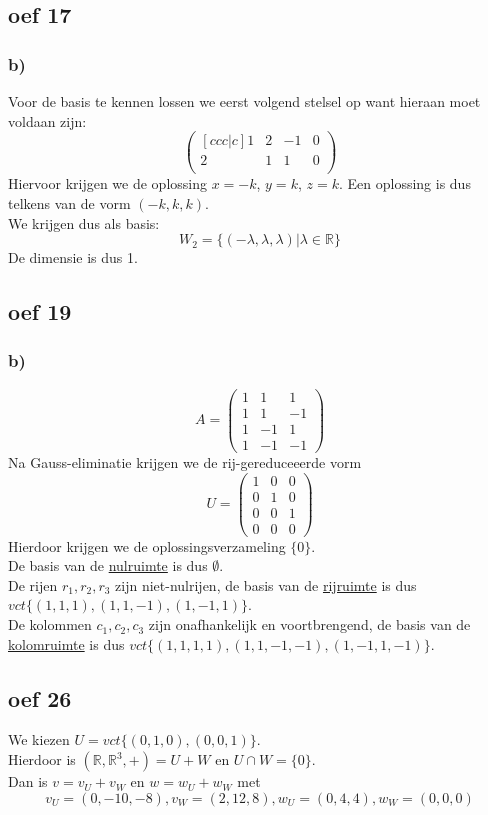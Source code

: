\documentclass[lineaire_algebra_oplossingen.tex]{subfiles}
\begin{document}
\subsection*{oef 17}
\subsubsection*{b)}
Voor de basis te kennen lossen we eerst volgend stelsel op want hieraan moet voldaan zijn:
$$
\begin{pmatrix}[c c c | c]
1 & 2&-1&0\\
2&1&1&0\\
\end{pmatrix}
$$
Hiervoor krijgen we de oplossing $x=-k$, $y= k$, $z=k$. Een oplossing is dus telkens van de vorm $(-k,k,k)$.\\
We krijgen dus als basis:
$$W_2 = \{(-\lambda, \lambda, \lambda)|\lambda \in \mathbb{R}\}$$
De dimensie is dus 1.
\subsection*{oef 19}
\subsubsection*{b)}
\[ A =
\begin{pmatrix}
  1 & 1 & 1\\
  1 & 1 & -1\\
  1 & -1 & 1\\
  1 & -1 & -1
\end{pmatrix}
\]
Na Gauss-eliminatie krijgen we de rij-gereduceeerde vorm
\[ U =
\begin{pmatrix}
  1 & 0 & 0\\
  0 & 1 & 0\\
  0 & 0 & 1\\
  0 & 0 & 0
\end{pmatrix}
\]
Hierdoor krijgen we de oplossingsverzameling $\{0\}$.\\
De basis van de \underline{nulruimte} is dus $\emptyset$.\\
De rijen $r_1, r_2, r_3$ zijn niet-nulrijen, de basis van de \underline{rijruimte} is dus $vct\{(1,1,1), (1,1,-1), (1,-1,1)\}$.\\
De kolommen $c_1, c_2, c_3$ zijn onafhankelijk en voortbrengend, de basis van de \underline{kolomruimte} is dus $vct\{(1,1,1,1), (1,1,-1,-1), (1,-1,1,-1)\}$.

\subsection*{oef 26}
We kiezen $U = vct\{(0,1,0), (0,0,1)\}$.\\ Hierdoor is $(\mathbb{R}, \mathbb{R}^3, +) = U + W$ en $U \cap W = \{0\}$.\\
Dan is $v = v_U + v_W$ en $w = w_U + w_W$ met
\[
v_U = (0,-10,-8), 
v_W = (2,12,8), 
w_U = (0,4,4), 
w_W = (0,0,0)
\]
\end{document}
